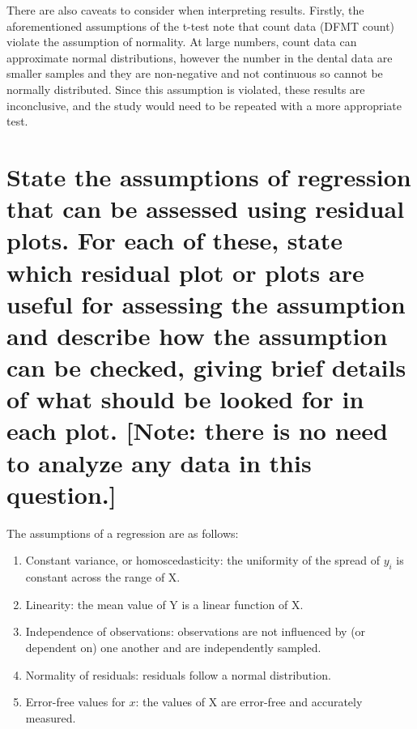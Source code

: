 \documentclass[11pt]{article}
\begin{document}
There are also caveats to consider when interpreting results. Firstly, the aforementioned assumptions of the t-test note that count data (DFMT count) violate the assumption of normality. At large numbers, count data can approximate normal distributions, however the number in the dental data are smaller samples and they are non-negative and not continuous so cannot be normally distributed. Since this assumption is violated, these results are inconclusive, and the study would need to be repeated with a more appropriate test.


\section{State the assumptions of regression that can be assessed using residual plots. For each of these, state which residual plot or plots are useful for assessing the assumption and describe how the assumption can be checked, giving brief details of what should be looked for in each plot. [Note: there is no need to analyze any data in this question.]}

The assumptions of a regression are as follows:
\begin{enumerate}
    \item Constant variance, or homoscedasticity: the uniformity of the spread of $y_i$ is constant across the range of X. 
    \item Linearity: the mean value of Y is a linear function of X.
    \item Independence of observations: observations are not influenced by (or dependent on) one another and are independently sampled.
    \item Normality of residuals: residuals follow a normal distribution.
    \item Error-free values for $x$: the values of X are error-free and accurately measured.
\end{enumerate}
\end{document}
